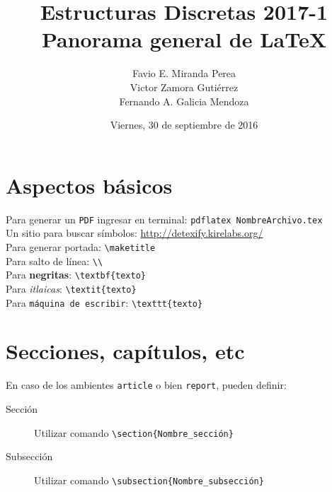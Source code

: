 \documentclass[spanish,12pt,letterpaper]{article}
\title{Estructuras Discretas 2017-1\\Panorama general de \LaTeX}
\author{Favio E. Miranda Perea\\Victor Zamora Gutiérrez\\Fernando A. Galicia Mendoza}
\affil{Facultad de ciencias, UNAM}
\date{Viernes, 30 de septiembre de 2016}
\theoremstyle{break}
\begin{document}
                  \maketitle

                  \section{Aspectos básicos}
                  Para generar un \texttt{PDF} ingresar en terminal: \verb!pdflatex NombreArchivo.tex!\\
                  Un sitio para buscar símbolos: \url{http://detexify.kirelabs.org/}\\

                  Para generar portada: \verb!\maketitle!\\
                  Para salto de línea: \verb!\\!\\
                  Para \textbf{negritas}: \verb!\textbf{texto}!\\
                  Para \textit{itlaicas}: \verb!\textit{texto}!\\
                  Para \texttt{máquina de escribir}: \verb!\texttt{texto}!\\

                  \section{Secciones, capítulos, etc}

                  En caso de los ambientes \verb!article! o bien \verb!report!, pueden definir:
                  \begin{description}
                  \item[Sección] Utilizar comando \verb!\section{Nombre_sección}!
                  \item[Subsección] Utilizar comando \verb!\subsection{Nombre_subsección}!
                  \end{description}
\end{document}
